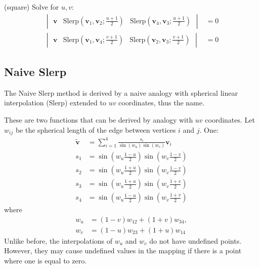 \documentclass{amsart}[12pt]
\begin{document}
(square)
Solve for $u, v$:
\begin{equation}
  \begin{split}
\begin{vmatrix} \mathbf v &
\mathrm{Slerp}(\mathbf v_1, \mathbf v_2; \frac{u+1}{2}) &
\mathrm{Slerp}(\mathbf v_4, \mathbf v_3; \frac{u+1}{2}) \end{vmatrix} &= 0 \\
\begin{vmatrix} \mathbf v &
\mathrm{Slerp}(\mathbf v_1, \mathbf v_4; \frac{v+1}{2}) &
\mathrm{Slerp}(\mathbf v_2, \mathbf v_3; \frac{v+1}{2}) \end{vmatrix} &= 0
\end{split}\end{equation}

\subsection{Naive Slerp}
The Naive Slerp method is derived by a naive analogy with spherical linear
interpolation (Slerp) extended to $uv$ coordinates, thus the
name.

These are two functions that can be derived by analogy with $uv$ coordinates.
Let $w_{ij}$ be the spherical length of the edge between vertices $i$ and $j$.
One:
\begin{equation}\begin{split}\label{eq:nsq1}
   \widetilde{\mathbf v} & = \sum_{i=1}^4\frac{s_i}{\sin(w_u)\sin(w_v)}  \mathbf v_i \\
s_1 & = \sin \left(w_u\frac{1-u}{2}\right)\sin \left(w_v\frac{1-v}{2}\right) \\
s_2 & = \sin \left(w_u\frac{1+u}{2}\right)\sin \left(w_v\frac{1-v}{2}\right) \\
s_3 & = \sin \left(w_u\frac{1+u}{2}\right)\sin \left(w_v\frac{1+v}{2}\right) \\
s_4 & = \sin \left(w_u\frac{1-u}{2}\right)\sin \left(w_v\frac{1+v}{2}\right)
\end{split}\end{equation}
where
\begin{equation}\begin{split}
  w_u &= (1-v) w_{12} + (1+v) w_{34},\\
  w_v &= (1-u) w_{23} + (1+u) w_{14}
\end{split}\end{equation}
Unlike before, the interpolations of $w_u$ and $w_v$ do not have undefined
points. However, they may cause undefined values in the mapping if there is a
point where one is equal to zero.
\end{document}
